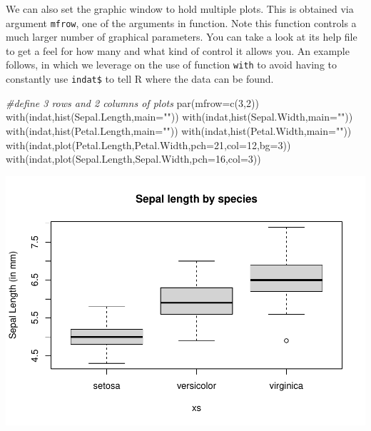 \documentclass[
]{article}
\newenvironment{Shaded}{\begin{snugshade}}{\end{snugshade}}
\newcommand{\AttributeTok}[1]{\textcolor[rgb]{0.77,0.63,0.00}{#1}}
\newcommand{\CommentTok}[1]{\textcolor[rgb]{0.56,0.35,0.01}{\textit{#1}}}
\newcommand{\DecValTok}[1]{\textcolor[rgb]{0.00,0.00,0.81}{#1}}
\newcommand{\FunctionTok}[1]{\textcolor[rgb]{0.00,0.00,0.00}{#1}}
\newcommand{\NormalTok}[1]{#1}
\newcommand{\StringTok}[1]{\textcolor[rgb]{0.31,0.60,0.02}{#1}}
\begin{document}
We can also set the graphic window to hold multiple plots. This is
obtained via argument \texttt{mfrow}, one of the arguments in function.
Note this function controls a much larger number of graphical
parameters. You can take a look at its help file to get a feel for how
many and what kind of control it allows you. An example follows, in
which we leverage on the use of function \texttt{with} to avoid having
to constantly use \texttt{indat\$} to tell R where the data can be
found.

\begin{Shaded}
\begin{Highlighting}[]
\CommentTok{\#define 3 rows and 2 columns of plots}
\FunctionTok{par}\NormalTok{(}\AttributeTok{mfrow=}\FunctionTok{c}\NormalTok{(}\DecValTok{3}\NormalTok{,}\DecValTok{2}\NormalTok{))}
\FunctionTok{with}\NormalTok{(indat,}\FunctionTok{hist}\NormalTok{(Sepal.Length,}\AttributeTok{main=}\StringTok{""}\NormalTok{))}
\FunctionTok{with}\NormalTok{(indat,}\FunctionTok{hist}\NormalTok{(Sepal.Width,}\AttributeTok{main=}\StringTok{""}\NormalTok{))}
\FunctionTok{with}\NormalTok{(indat,}\FunctionTok{hist}\NormalTok{(Petal.Length,}\AttributeTok{main=}\StringTok{""}\NormalTok{))}
\FunctionTok{with}\NormalTok{(indat,}\FunctionTok{hist}\NormalTok{(Petal.Width,}\AttributeTok{main=}\StringTok{""}\NormalTok{))}
\FunctionTok{with}\NormalTok{(indat,}\FunctionTok{plot}\NormalTok{(Petal.Length,Petal.Width,}\AttributeTok{pch=}\DecValTok{21}\NormalTok{,}\AttributeTok{col=}\DecValTok{12}\NormalTok{,}\AttributeTok{bg=}\DecValTok{3}\NormalTok{))}
\FunctionTok{with}\NormalTok{(indat,}\FunctionTok{plot}\NormalTok{(Sepal.Length,Sepal.Width,}\AttributeTok{pch=}\DecValTok{16}\NormalTok{,}\AttributeTok{col=}\DecValTok{3}\NormalTok{))}
\end{Highlighting}
\end{Shaded}

\includegraphics{TAMsIntro2RviaRStudioTutorial_files/figure-latex/unnamed-chunk-50-1.pdf}
\end{document}
